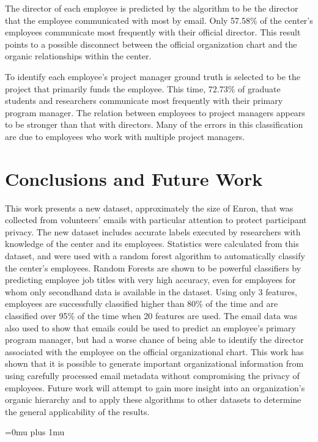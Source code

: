 \documentclass[10pt,twocolumn,conference]{IEEEtran}
\begin{document}
The director of each employee is predicted by the algorithm to be the director that the employee communicated with most by email.  Only 57.58\% of the center's employees communicate most frequently with their official director.   This result points to a possible disconnect between the official organization chart and the organic relationships within the center.

To identify each employee's project manager ground truth is selected to be the project that primarily funds the employee.  This time, 72.73\% of graduate students and researchers communicate most frequently with their primary program manager.  The relation between employees to project managers appears to be stronger than that with directors.  Many of the errors in this classification are due to employees who work with multiple project managers.  

\section{Conclusions and Future Work} \label{Conclusions}
This work presents a new dataset, approximately the size of Enron, that was collected from volunteers' emails with particular attention to protect participant privacy.  The new dataset includes accurate labels executed by researchers with knowledge of the center and its employees.  Statistics were calculated from this dataset, and were used with a random forest algorithm to automatically classify the center's employees.  Random Forests are shown to be powerful classifiers by predicting employee job titles with very high accuracy, even for employees for whom only secondhand data is available in the dataset.  Using only 3 features, employees are successfully classified higher than 80\% of the time and are classified over 95\% of the time when 20 features are used.  The email data was also used to show that emails could be used to predict an employee's primary program manager, but had a worse chance of being able to identify the director associated with the employee on the official organizational chart.  This work has shown that it is possible to generate important organizational information from using carefully processed email metadata without compromising the privacy of employees.  Future work will attempt to gain more insight into an organization's organic hierarchy and to apply these algorithms to other datasets to determine the general applicability of the results.

\Urlmuskip=0mu plus 1mu\relax


\end{document}
